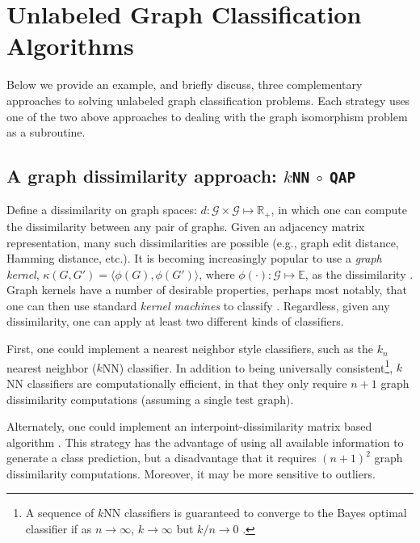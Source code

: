 \documentclass{article} %
\newcommand{\EE}{\mathbb{E}}           %
\providecommand{\mc}[1]{\mathcal{#1}}
\newcommand{\Real}{\mathbb{R}}
\newcommand{\conv}{\rightarrow}
\newcommand{\qap}{\texttt{QAP} }
\begin{document}


\section{Unlabeled Graph Classification Algorithms} %
\label{sec:algorithms}

Below we provide an example, and briefly discuss, three complementary approaches to solving unlabeled graph classification problems.  Each strategy uses one of the two above approaches to dealing with the graph isomorphism problem as a subroutine.

\subsection{A graph dissimilarity approach: \texttt{$k$NN} $\circ$ \qap} %
\label{ssub:_k_nn_circ_qap}

Define a dissimilarity on graph spaces: $d: \mc{G} \times \mc{G} \mapsto \Real_+$, in which one can compute the dissimilarity between any pair of graphs. Given an adjacency matrix representation, many such dissimilarities are possible (e.g., graph edit distance, Hamming distance, etc.).  It is becoming increasingly popular to use a \emph{graph kernel}, $\kappa(G,G')=\langle \phi(G), \phi(G') \rangle$, where $\phi(\cdot): \mc{G} \mapsto \EE$, as the dissimilarity \cite{Bunke2011}.  Graph kernels have a number of desirable properties, perhaps most notably, that one can then use standard \emph{kernel machines} to classify \cite{Vapnik1998}.	Regardless, given any dissimilarity, one can apply at least two different kinds of classifiers.


First, one could implement a nearest neighbor style classifiers, such as the $k_n$ nearest neighbor ($k$NN) classifier.  In addition to being universally consistent\footnote{A sequence of $k$NN classifiers is guaranteed to converge to the Bayes optimal classifier  if  as $n \conv \infty$, $k \conv \infty$ but $k/n \conv 0$ \cite{Devroye1997}.}, $k$NN classifiers are computationally efficient, in that they only require $n+1$ graph dissimilarity computations (assuming a single test graph).  

Alternately, one could implement an interpoint-dissimilarity matrix based algorithm \cite{Duin2011}. This strategy has the advantage of using all available information to generate a class prediction, but a disadvantage that it requires $(n+1)^2$ graph dissimilarity computations. Moreover, it may be more sensitive to outliers.
\end{document}

